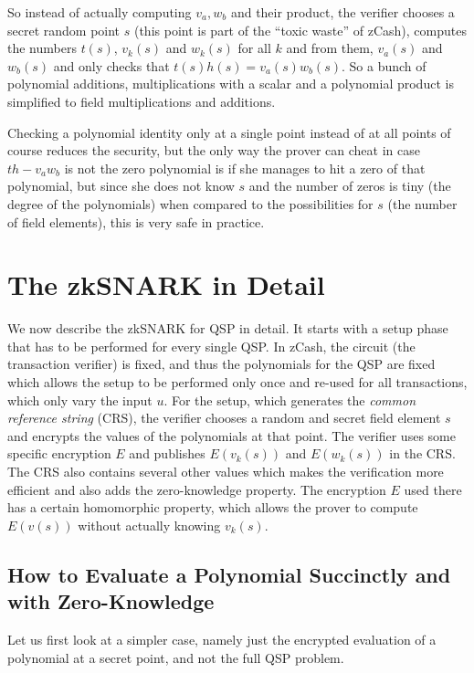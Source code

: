 \documentclass[11pt,letterpaper]{article}
\begin{document}
So instead of actually computing $v_{a}, w_{b}$ and their product, the verifier chooses a secret random point $s$ (this point is part of the ``toxic waste'' of zCash), computes the numbers $t(s)$, $v_{k}(s)$ and $w_{k}(s)$ for all $k$ and from them,  $v_{a}(s)$ and $w_{b}(s)$ and only checks that $t(s) h(s) = v_{a}(s) w_{b} (s)$. So a bunch of polynomial additions, multiplications with a scalar and a polynomial product is simplified to field multiplications and additions.


Checking a polynomial identity only at a single point instead of at all points of course reduces the security, but the only way the prover can cheat in case $t h - v_{a} w_{b}$ is not the zero polynomial is if she manages to hit a zero of that polynomial, but since she does not know $s$ and the number of zeros is tiny (the degree of the polynomials) when compared to the possibilities for $s$ (the number of field elements), this is very safe in practice.

\section{The zkSNARK in Detail}


We now describe the zkSNARK for QSP in detail. It starts with a setup phase that has to be performed for every single QSP. In zCash, the circuit (the transaction verifier) is fixed, and thus the polynomials for the QSP are fixed which allows the setup to be performed only once and re-used for all transactions, which only vary the input $u$. For the setup, which generates the \textit{common reference string} (CRS), the verifier chooses a random and secret field element $s$ and encrypts the values of the polynomials at that point. The verifier uses some specific encryption $E$ and publishes $E(v_{k}(s))$ and $E(w_{k}(s))$ in the CRS. The CRS also contains several other values which makes the verification more efficient and also adds the zero-knowledge property. The encryption $E$ used there has a certain homomorphic property, which allows the prover to compute $E(v(s))$ without actually knowing $v_{k}(s)$.

\subsection{How to Evaluate a Polynomial Succinctly and with Zero-Knowledge}


Let us first look at a simpler case, namely just the encrypted evaluation of a polynomial at a secret point, and not the full QSP problem.
\end{document}
